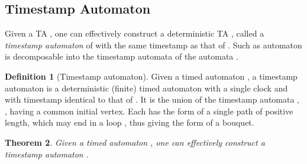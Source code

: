 \documentclass[11pt]{amsart}
\newtheorem{theorem}{Theorem}[section]
\theoremstyle{definition}
\newtheorem{definition}[theorem]{Definition}
\begin{document}
\subsection{Timestamp Automaton}
Given a TA , one can effectively construct a deterministic TA , called a \emph{timestamp automaton} of  with the same timestamp as that of .
Such as automaton is decomposable into the timestamp automata of the automata .
\begin{definition}[Timestamp automaton]
	Given a timed automaton , a timestamp automaton  is a deterministic (finite) timed automaton with a single clock and with timestamp identical to that of .
	It is the union of the timestamp automata , , having a common initial vertex.
	Each  has the form of a single path  of positive length, which may end in a loop , thus giving  the form of a bouquet.
\end{definition}
\begin{theorem}
	\label{th:timestamp_contruct}
	Given a timed automaton , one can effectively construct a timestamp automaton .
\end{theorem}
\end{document}

